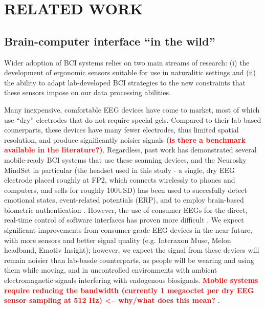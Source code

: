 \section{\uppercase{Related Work}}
\subsection{Brain-computer interface ``in the wild''}

\noindent Wider adoption of BCI systems relies on two main streams of research: (i) the development of ergonomic sensors suitable for use in naturalitic settings and (ii) the ability to adapt lab-developed BCI strategies to the new constraints that these sensors impose on our data processing abilities. 

Many inexpensive, comfortable EEG devices have come to market, most of which use ``dry'' electrodes that do not require special gels. Compared to their lab-based counerparts, these devices have many fewer electrodes, thus limited spatial resolution, and produce significantly noisier signals \textcolor{red}{\bf (is there a benchmark available in the literature?)}. Regardless, past work has demonstrated several mobile-ready BCI systems that use these scanning devices, and the Neurosky MindSet in particular (the headset used in this study - a single, dry EEG electrode placed roughly at FP2, which connects wirelessly to phones and computers, and sells for roughly 100USD) has been used to succesfully detect emotional states, event-related potentials (ERP), and to employ brain-based biometric authentication \cite{crowley_evaluating_2010,grierson_better_2011,adams_i_2013}.  However, the use of consumer EEGs for the direct, real-time control of software interfaces has proven more difficult \cite{carrino_self-paced_2012,larsen_classification_2011}. We expect significant improvements from consumer-grade EEG devices in the near future, with more sensors and better signal quality (e.g. Interaxon Muse, Melon headband, Emotiv Insight); however, we expect the signal from these devices will remain noisier than lab-basde counterparts, as people will be wearing and using them while moving, and in uncontrolled environments with ambient electromagnetic signals interfering with endogenous biosignals. \textcolor{red}{\bf Mobile systems require reducing the bandwidth (currently 1 megaoctet per dry EEG sensor sampling at 512 Hz) <-- why/what does this mean? }.

